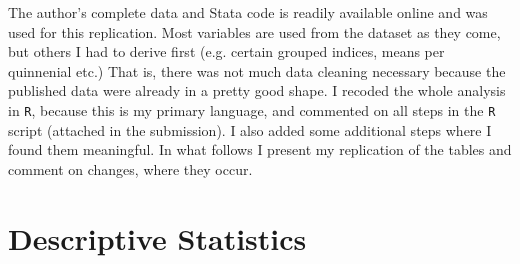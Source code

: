 \documentclass[a4paper]{article}\usepackage[]{graphicx}\usepackage[]{xcolor}
\begin{document}
\hspace*{5mm} The author's complete data and Stata code is readily available online and was used for this replication. Most variables are used from the dataset as they come, but others I had to derive first (e.g. certain grouped indices, means per quinnenial etc.) That is, there was not much data cleaning necessary because the published data were already in a pretty good shape. I recoded the whole analysis in \texttt{R}, because this is my primary language, and commented on all steps in the \texttt{R} script (attached in the submission). I also added some additional steps where I found them meaningful. In what follows I present my replication of the tables and comment on changes, where they occur. 

\section{Descriptive Statistics}
\end{document}
